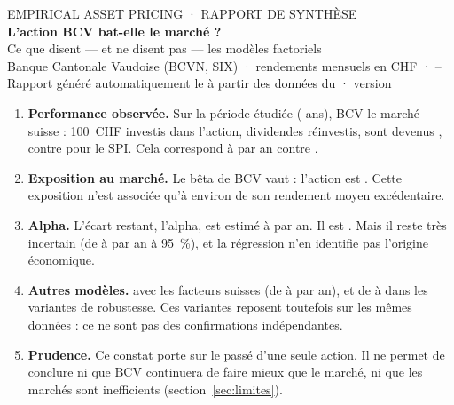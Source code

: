 \documentclass[11pt,a4paper]{article}
\begin{document}
\begin{center}
  {\small\color{gris} EMPIRICAL ASSET PRICING · RAPPORT DE SYNTHÈSE}\\[6pt]
  {\LARGE\bfseries L'action BCV bat-elle le marché ?}\\[4pt]
  {\large Ce que disent — et ne disent pas — les modèles factoriels}\\[8pt]
  {\small Banque Cantonale Vaudoise (BCVN, SIX) · rendements mensuels en CHF · \PeriodeDebut{} – \PeriodeFin{}}\\[2pt]
  {\small\color{gris} Rapport généré automatiquement le \DateRapport{} à partir des données du \DateDonnees{} · version \texttt{\Commit}}
\end{center}

\vspace{4pt}

\begin{essentiel}
\begin{enumerate}[leftmargin=*,label=\textbf{\arabic*.}]
  \item \textbf{Performance observée.} Sur la période étudiée (\Annees{} ans), BCV \PerfPhrase{} le marché suisse : 100~CHF investis dans l'action, dividendes réinvestis, sont devenus \CroissanceBCV{}, contre \CroissanceSPI{} pour le SPI. Cela correspond à \RendAnnBCV{} par an contre \RendAnnSPI{}.
  \item \textbf{Exposition au marché.} Le bêta de BCV vaut \BetaM{} : l'action est \BetaSens. Cette exposition n'est associée qu'à environ \PartMarchePct{} de son rendement moyen excédentaire.
  \item \textbf{Alpha.} L'écart restant, l'alpha, est estimé à \AlphaA{} par an. Il est \AlphaVerdict{}. Mais il reste très incertain (de \AlphaALo{} à \AlphaAHi{} par an à 95~\%), et la régression n'en identifie pas l'origine économique.
  \item \textbf{Autres modèles.} \CompEssentiel{} avec les facteurs suisses (de \AlphaMinA{} à \AlphaMaxA{} par an), et de \RobAlphaMinA{} à \RobAlphaMaxA{} dans les variantes de robustesse. Ces variantes reposent toutefois sur les mêmes données : ce ne sont pas des confirmations indépendantes.
  \item \textbf{Prudence.} Ce constat porte sur le passé d'une seule action. Il ne permet de conclure ni que BCV continuera de faire mieux que le marché, ni que les marchés sont inefficients (section~\ref{sec:limites}).
\end{enumerate}
\end{essentiel}
\end{document}
